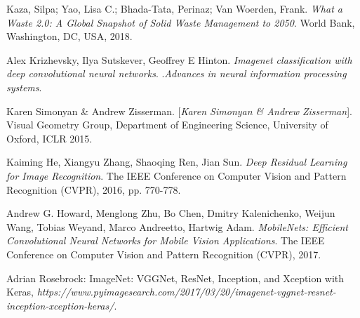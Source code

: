 \documentclass[10pt,twocolumn,letterpaper]{article}
\begin{document}
\begin{thebibliography}{9}
Kaza, Silpa; Yao, Lisa C.; Bhada-Tata, Perinaz; Van Woerden, Frank.
\textit{What a Waste 2.0: A Global Snapshot of Solid Waste Management to 2050}. 
World Bank, Washington, DC, USA,  2018.

Alex Krizhevsky, Ilya Sutskever, Geoffrey E Hinton.
\textit{Imagenet classification with deep convolutional neural networks}. 
.\textit{Advances in neural information processing systems}.

Karen Simonyan & Andrew Zisserman.
[\textit{Karen Simonyan & Andrew Zisserman}]. Visual Geometry Group, Department of Engineering Science, University of Oxford, ICLR 2015.
 
Kaiming He, Xiangyu Zhang, Shaoqing Ren, Jian Sun.
\textit{Deep Residual Learning for Image Recognition}. 
The IEEE Conference on Computer Vision and Pattern Recognition (CVPR), 2016, pp. 770-778.

Andrew G. Howard, Menglong Zhu, Bo Chen, Dmitry Kalenichenko, Weijun Wang, Tobias Weyand, Marco Andreetto, Hartwig Adam.
\textit{MobileNets: Efficient Convolutional Neural Networks for Mobile Vision Applications}. 
The IEEE Conference on Computer Vision and Pattern Recognition (CVPR), 2017.

Adrian Rosebrock: ImageNet: VGGNet, ResNet, Inception, and Xception with Keras,
\textit{https://www.pyimagesearch.com/2017/03/20/imagenet-vggnet-resnet-inception-xception-keras/}. 
\end{thebibliography}
\end{document}
